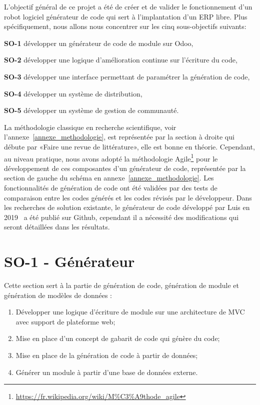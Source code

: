 \label{sec:Theme1} \label{chapitre_methode}
L’objectif général de ce projet a été de créer et de valider le fonctionnement d’un robot logiciel générateur de code qui sert à l’implantation d’un ERP libre. Plus spécifiquement, nous allons nous concentrer sur les cinq sous-objectifs suivants:

\textbf{SO-1} développer un générateur de code de module sur Odoo,

\textbf{SO-2} développer une logique d'amélioration continue sur l'écriture du code,

\textbf{SO-3} développer une interface permettant de paramétrer la génération de code,

\textbf{SO-4} développer un système de distribution,

\textbf{SO-5} développer un système de gestion de communauté.

La méthodologie classique en recherche scientifique, voir l'annexe~\ref{annexe_methodologie}, est représentée par la section à droite qui débute par «Faire une revue de littérature», elle est bonne en théorie. Cependant, au niveau pratique, nous avons adopté la méthodologie Agile\footnote{\url{https://fr.wikipedia.org/wiki/M\%C3\%A9thode_agile}} pour le développement de ces composantes d'un générateur de code, représentée par la section de gauche du schéma en annexe~\ref{annexe_methodologie}. Les fonctionnalités de génération de code ont été validées par des tests de comparaison entre les codes générés et les codes révisés par le développeur. Dans les recherches de solution existante, le générateur de code développé par Luis en 2019~\cite{bluiksnot_repo} a été publié sur Github, cependant il a nécessité des modifications qui seront détaillées dans les résultats. 

\section{SO-1 - Générateur}
Cette section sert à la partie de génération de code, génération de module et génération de modèles de données :
\begin{enumerate}
    \item Développer une logique d’écriture de module sur une architecture de MVC avec support de plateforme web;
    \item Mise en place d’un concept de gabarit de code qui génère du code;
    \item Mise en place de la génération de code à partir de données;
    \item Générer un module à partir d’une base de données externe.
\end{enumerate}


